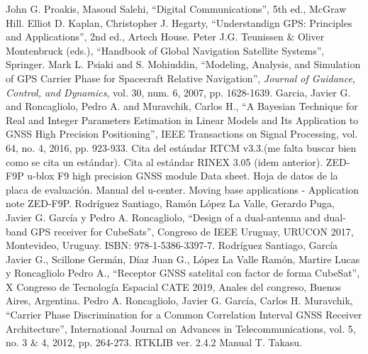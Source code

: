 \documentclass[a4paper,12pt,oneside,onecolumn,final,openright]{book}%
\begin{document}
\begin{thebibliography}{00}
 John G. Proakis, Masoud Salehi, ``Digital Communications'', 5th ed., McGraw Hill.
 Elliot D. Kaplan, Christopher J. Hegarty, ``Understandign GPS: Principles and Applications'', 2nd ed., Artech House.
 Peter J.G. Teunissen \& Oliver Montenbruck (eds.), ``Handbook of Global Navigation Satellite Systems'', Springer.
 Mark L. Psiaki and S. Mohiuddin, ``Modeling, Analysis, and Simulation of GPS Carrier Phase for Spacecraft Relative Navigation'', \textit{Journal of Guidance, Control, and Dynamics}, vol. 30, num. 6, 2007, pp. 1628-1639.
 Garcia, Javier G. and Roncagliolo, Pedro A. and Muravchik, Carlos H., ``A Bayesian Technique for Real and Integer Parameters Estimation in Linear Models and Its Application to GNSS High Precision Positioning'', IEEE Transactions on Signal Processing, vol. 64, no. 4, 2016, pp. 923-933.
 Cita del estándar RTCM v3.3.(me falta buscar bien como se cita un estándar).
 Cita al estándar RINEX 3.05 (idem anterior).
 ZED-F9P u-blox F9 high precision GNSS module Data sheet.
 Hoja de datos de la placa de evaluación.
 Manual del u-center.
 Moving base applications - Application note ZED-F9P.
 Rodríguez Santiago, Ramón López La Valle, Gerardo Puga, Javier G. García y Pedro A. Roncagliolo, ``Design of a dual-antenna and dual-band GPS receiver for CubeSats'', Congreso de IEEE Uruguay, URUCON 2017, Montevideo, Uruguay. ISBN: 978-1-5386-3397-7.
 Rodríguez Santiago, García Javier G., Scillone Germán, Díaz Juan G., López La Valle Ramón, Martire Lucas y Roncagliolo Pedro A., ``Receptor GNSS satelital con factor de forma CubeSat'', X Congreso de Tecnología Espacial CATE 2019, Anales del congreso, Buenos Aires, Argentina.
 Pedro A. Roncagliolo, Javier G. García, Carlos H. Muravchik, ``Carrier Phase Discrimination for a Common Correlation Interval GNSS Receiver Architecture'', International Journal on Advances in Telecommunications, vol. 5, no. 3 \& 4, 2012, pp. 264-273.
 RTKLIB ver. 2.4.2 Manual T. Takasu.
\end{thebibliography}
\end{document}
